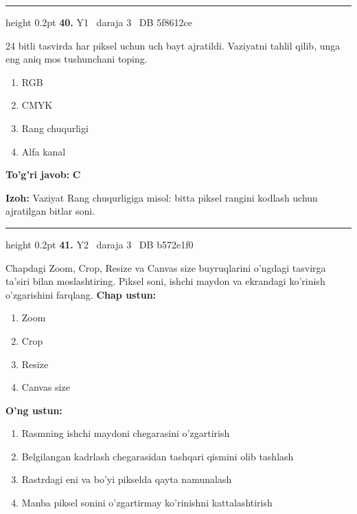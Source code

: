 \documentclass[10pt,a4paper,oneside]{article}
\begin{document}
\vspace{2mm}\hrule height 0.2pt \vspace{4mm}
\hypertarget{q40}{\textbf{\color{ink}40.}}  {\color{muted}\scriptsize Y1 \textbullet\ daraja 3 \textbullet\ DB 5f8612ce}
\par
24 bitli tasvirda har piksel uchun uch bayt ajratildi. Vaziyatni tahlil qilib, unga eng aniq mos tushunchani toping.
\begin{enumerate}[label=\Alph*),leftmargin=9mm]
\item RGB
\item CMYK
\item Rang chuqurligi
\item Alfa kanal
\end{enumerate}
\begin{tcolorbox}[enhanced,breakable,colback=teal!4,colframe=teal!45!black,boxrule=0.45pt,arc=1.2mm,left=2.8mm,right=2.8mm,top=2mm,bottom=2mm,before skip=2mm,after skip=2mm]
\textbf{\color{teal}To'g'ri javob:} \textbf{C}
\par\smallskip
\textbf{Izoh:} Vaziyat Rang chuqurligiga misol: bitta piksel rangini kodlash uchun ajratilgan bitlar soni.
\end{tcolorbox}
\vspace{2mm}\hrule height 0.2pt \vspace{4mm}
\hypertarget{q41}{\textbf{\color{ink}41.}}  {\color{muted}\scriptsize Y2 \textbullet\ daraja 3 \textbullet\ DB b572e1f0}
\par
Chapdagi Zoom, Crop, Resize va Canvas size buyruqlarini o'ngdagi tasvirga ta'siri bilan moslashtiring. Piksel soni, ishchi maydon va ekrandagi ko'rinish o'zgarishini farqlang.
\textbf{\footnotesize Chap ustun:}
\begin{enumerate}[label=\arabic*),leftmargin=9mm]
\item Zoom
\item Crop
\item Resize
\item Canvas size
\end{enumerate}
\textbf{\footnotesize O'ng ustun:}
\begin{enumerate}[label=\Alph*),leftmargin=9mm]
\item Rasmning ishchi maydoni chegarasini o'zgartirish
\item Belgilangan kadrlash chegarasidan tashqari qismini olib tashlash
\item Rastrdagi eni va bo'yi pikselda qayta namunalash
\item Manba piksel sonini o'zgartirmay ko'rinishni kattalashtirish
\end{enumerate}
\end{document}
